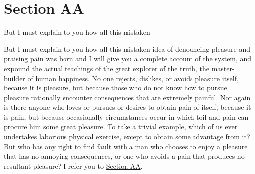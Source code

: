 \section*{Section AA}
\hypertarget{_section_aa}{But I must explain to you how all this mistaken}
But I must explain to you how all this mistaken
idea of denouncing pleasure and praising pain
was born and I will give you a complete account
of the system, and expound the actual teachings
of the great explorer of the truth, the
master-builder of human happiness. No one
rejects, dislikes, or avoids pleasure itself,
because it is pleasure, but because those who
do not know how to pursue pleasure rationally
encounter consequences that are extremely
painful. Nor again is there anyone who loves
or pursues or desires to obtain pain of itself,
because it is pain, but because occasionally
circumstances occur in which toil and pain can
procure him some great pleasure. To take a trivial
example, which of us ever undertakes laborious
physical exercise, except to obtain some
advantage from it? But who has any right
to find fault with a man who chooses to
enjoy a pleasure that has no
annoying consequences, or one who avoids
a pain that produces no resultant pleasure?
I refer you to \hyperlink{_section_aa}{Section AA}.

